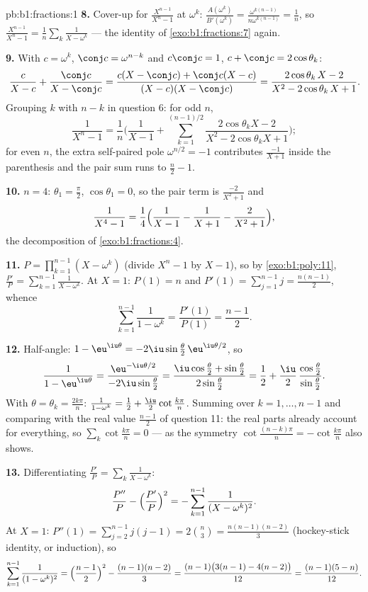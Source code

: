 \begin{solution}{pb:b1:fractions:1}
\textbf{8.} Cover-up for $\frac{X^{n-1}}{X^n - 1}$ at $\omega^k$:
$\frac{A(\omega^k)}{B'(\omega^k)} =
\frac{\omega^{k(n-1)}}{n\omega^{k(n-1)}} = \frac1n$, so
$\frac{X^{n-1}}{X^n-1} = \frac1n\sum_k\frac1{X - \omega^k}$ ---
the identity of \cref{exo:b1:fractions:7} again.

\textbf{9.} With $c = \omega^k$, $\conj c = \omega^{n-k}$ and
$c\conj c = 1$, $c + \conj c = 2\cos\theta_k$:
\[
\frac{c}{X - c} + \frac{\conj c}{X - \conj c}
= \frac{c(X - \conj c) + \conj c(X - c)}
{(X - c)(X - \conj c)}
= \frac{2\cos\theta_k\,X - 2}{X^2 - 2\cos\theta_k\,X + 1} .
\]
Grouping $k$ with $n - k$ in question 6: for odd $n$,
\[
\frac1{X^n - 1} = \frac1n\Biggl(\frac1{X-1} +
\sum_{k=1}^{(n-1)/2}
\frac{2\cos\theta_k X - 2}{X^2 - 2\cos\theta_k X + 1}\Biggr) ;
\]
for even $n$, the extra self-paired pole $\omega^{n/2} = -1$
contributes $\frac{-1}{X+1}$ inside the parenthesis and the pair
sum runs to $\frac n2 - 1$.

\textbf{10.} $n = 4$: $\theta_1 = \frac\pi2$, $\cos\theta_1 = 0$,
so the pair term is $\frac{-2}{X^2+1}$ and
\[
\frac1{X^4-1} = \frac14\Bigl(\frac1{X-1} - \frac1{X+1}
- \frac2{X^2+1}\Bigr) ,
\]
the decomposition of \cref{exo:b1:fractions:4}.

\textbf{11.} $P = \prod_{k=1}^{n-1}(X - \omega^k)$ (divide $X^n -
1$ by $X - 1$), so by \cref{exo:b1:poly:11}, $\frac{P'}P =
\sum_{k=1}^{n-1}\frac1{X-\omega^k}$. At $X = 1$: $P(1) = n$ and
$P'(1) = \sum_{j=1}^{n-1}j = \frac{n(n-1)}2$, whence
\[
\sum_{k=1}^{n-1}\frac1{1 - \omega^k}
= \frac{P'(1)}{P(1)} = \frac{n-1}2 .
\]

\textbf{12.} Half-angle: $1 - \eu^{\iu\theta} =
-2\iu\sin\frac\theta2\,\eu^{\iu\theta/2}$, so
\[
\frac1{1 - \eu^{\iu\theta}}
= \frac{\eu^{-\iu\theta/2}}{-2\iu\sin\frac\theta2}
= \frac{\iu\cos\frac\theta2 + \sin\frac\theta2}
{2\sin\frac\theta2}
= \frac12 + \frac\iu2\,
\frac{\cos\frac\theta2}{\sin\frac\theta2} .
\]
With $\theta = \theta_k = \frac{2k\pi}n$: $\frac1{1-\omega^k} =
\frac12 + \frac\iu2\cot\frac{k\pi}n$. Summing over $k = 1, \dots,
n-1$ and comparing with the real value $\frac{n-1}2$ of
question 11: the real parts already account for everything, so
$\sum_k\cot\frac{k\pi}n = 0$ --- as the symmetry $\cot\frac{(n-k)
\pi}n = -\cot\frac{k\pi}n$ also shows.

\textbf{13.} Differentiating $\frac{P'}P = \sum_k\frac1{X -
\omega^k}$:
\[
\frac{P''}P - \Bigl(\frac{P'}P\Bigr)^2
= -\sum_{k=1}^{n-1}\frac1{(X - \omega^k)^2} .
\]
At $X = 1$: $P''(1) = \sum_{j=2}^{n-1}j(j-1) = 2\binom n3 =
\frac{n(n-1)(n-2)}3$ (hockey-stick identity, or induction), so
\[
\sum_{k=1}^{n-1}\frac1{(1 - \omega^k)^2}
= \Bigl(\frac{n-1}2\Bigr)^2 - \frac{(n-1)(n-2)}3
= \frac{(n-1)\bigl(3(n-1) - 4(n-2)\bigr)}{12}
= \frac{(n-1)(5-n)}{12} .
\]


\end{solution}

